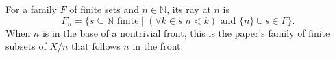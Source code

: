 \begin{definition}
For a family $F$ of finite sets and $n\in\mathbb N$, its ray at $n$ is
\[
F_n=\{s\subseteq\mathbb N\text{ finite}\mid
       (\forall k\in s\; n<k)\text{ and }\{n\}\cup s\in F\}.
\]
When $n$ is in the base of a nontrivial front, this is the paper's family of
finite subsets of $X/n$ that follows $n$ in the front.
\end{definition}
